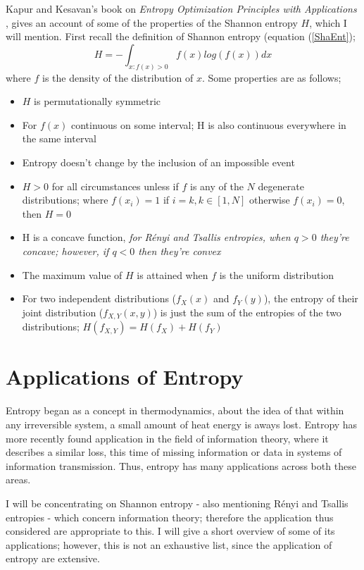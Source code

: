 \documentclass{report}
\begin{document}
Kapur and Kesavan's book on \textit{Entropy Optimization Principles with Applications} \cite{paper8}, gives an account of some of the properties of the Shannon entropy $H$, which I will mention. First recall the definition of Shannon entropy (equation (\ref{ShaEnt});
\begin{equation}
H = - \int_{x : f(x) > 0} f(x) log(f(x)) dx \nonumber
\end{equation}
where $f$ is the density of the distribution of $x$. Some properties are as follows; 
\begin{itemize}
\item $H$ is permutationally symmetric
\item For $f(x)$ continuous on some interval; H is also continuous everywhere in the same interval
\item Entropy doesn't change by the inclusion of an impossible event
\item $H > 0$ for all circumstances unless if $f$ is any of the $N$ degenerate distributions; where $f(x_{i}) = 1$ if $i = k, k \in [1, N]$ otherwise $f(x_{i}) = 0$, then $H=0$
\item H is a concave function, \textit{for R\'enyi and Tsallis entropies, when $q > 0$ they're concave; however, if $q<0$ then they're convex}
\item The maximum value of $H$ is attained when $f$ is the uniform distribution
\item For two independent distributions ($f_{X}(x)$ and $f_{Y}(y)$), the entropy of their joint distribution ($f_{X,Y}(x,y)$) is just the sum of the entropies of the two distributions; $H(f_{X,Y}) = H(f_{X}) + H(f_{Y})$
\end{itemize}


\section{Applications of Entropy}

Entropy began as a concept in thermodynamics, about the idea of that within any irreversible system, a small amount of heat energy is aways lost. Entropy has more recently found application in the field of information theory, where it describes a similar loss, this time of missing information or data in systems of information transmission. Thus, entropy has many applications across both these areas.

I will be concentrating on Shannon entropy - also mentioning R\'enyi and Tsallis entropies - which concern information theory; therefore the application thus considered are appropriate to this. I will give a short overview of some of its applications; however, this is not an exhaustive list, since the application of entropy are extensive.
\end{document}
